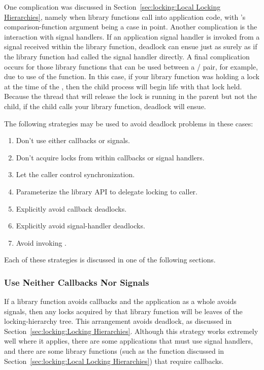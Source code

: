 One complication was discussed in
Section~\ref{sec:locking:Local Locking Hierarchies}, namely
when library functions call into application code, with 's
comparison-function argument being a case in point.
Another complication is the interaction with signal handlers.
If an application signal handler is invoked from a signal received within
the library function, deadlock can ensue just as surely as
if the library function had called the signal handler directly.
A final complication occurs for those library functions that can be used
between a / pair, for example, due to use of
the  function.
In this case, if your library function was holding a lock at the time of
the , then the child process will begin life with that lock held.
Because the thread that will release the lock is running in the parent
but not the child, if the child calls your library function, deadlock
will ensue.

The following strategies may be used to avoid deadlock problems in these cases:

\begin{enumerate}
\item	Don't use either callbacks or signals.
\item	Don't acquire locks from within callbacks or signal handlers.
\item	Let the caller control synchronization.
\item	Parameterize the library API to delegate locking to caller.
\item	Explicitly avoid callback deadlocks.
\item	Explicitly avoid signal-handler deadlocks.
\item	Avoid invoking .
\end{enumerate}

Each of these strategies is discussed in one of the following sections.

\subsubsection{Use Neither Callbacks Nor Signals}
\label{sec:locking:Use Neither Callbacks Nor Signals}

If a library function avoids callbacks and the application as a whole
avoids signals, then any locks acquired by that library function will
be leaves of the locking-hierarchy tree.
This arrangement avoids deadlock, as discussed in
Section~\ref{sec:locking:Locking Hierarchies}.
Although this strategy works extremely well where it applies,
there are some applications that must use signal handlers,
and there are some library functions (such as the  function
discussed in
Section~\ref{sec:locking:Local Locking Hierarchies})
that require callbacks.

